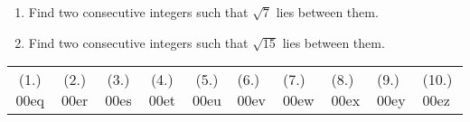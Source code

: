 \begin{enumerate}[noitemsep, label=\textbf{\arabic*}. ]
\begin{enumerate}[noitemsep, label=\textbf{\alph*}. ]
\begin{enumerate}[noitemsep, label=\textbf{\roman*}. ]
            \item 3 and 4\item 4 and 5\item 5 and 6\item 6 and 7\end{enumerate}
                      \item $\sqrt[3]{5}$ lies between:
\label{m38347*id7351}\begin{enumerate}[noitemsep, label=\textbf{\roman*}. ] 
            \item  1 and 2\item  2 and 3\item  3 and 4\item  4 and 5\end{enumerate}
                     \item $\sqrt[3]{10}$ lies between:
\label{m38347*id76451}\begin{enumerate}[noitemsep, label=\textbf{\roman*}. ] 
            \item  1 and 2\item  2 and 3\item  3 and 4\item  4 and 5\end{enumerate}
                      \item $\sqrt[3]{20}$ lies between:
\label{m38347*id7334}\begin{enumerate}[noitemsep, label=\textbf{\roman*}. ] 
            \item 2 and 3\item 3 and 4\item 4 and 5\item 5 and 6\end{enumerate}
                      \item $\sqrt[3]{30}$ lies between:
\label{m38347*id73224}\begin{enumerate}[noitemsep, label=\textbf{\roman*}. ] 
            \item 3 and 4\item 4 and 5\item 5 and 6\item 6 and 7\end{enumerate}
                      \end{enumerate}
        \item  Find two consecutive integers such that $\sqrt{7}$ lies between them.          \item  Find two consecutive integers such that $\sqrt{15}$ lies between them.          \end{enumerate}
  \label{m38347**end}
\practiceinfo
\par 
 \par \begin{tabular}[h]{ccccc}
 (1.) 00eq&  (2.) 00er&  (3.) 00es&  (4.) 00et&  (5.) 00eu&  (6.) 00ev&  (7.) 00ew&  (8.) 00ex&  (9.) 00ey&  (10.) 00ez& \end{tabular}
